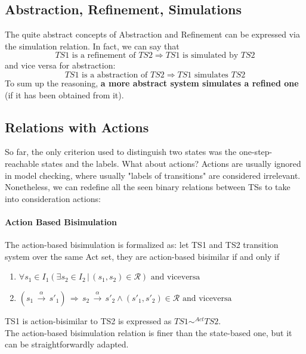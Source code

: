 \documentclass{article}
\begin{document}
			\subsection{Abstraction, Refinement, Simulations}
				The quite abstract concepts of Abstraction and Refinement can be expressed via the simulation relation. In fact, we can say that
				\begin{equation}
					TS1 \text{ is a refinement of } TS2 \Rightarrow TS1 \text{ is simulated by } TS2
				\end{equation}
				and vice versa for abstraction:
				\begin{equation}
					TS1 \text{ is a abstraction of } TS2 \Rightarrow TS1 \text{ simulates } TS2
				\end{equation}
				To sum up the reasoning, \textbf{a more abstract system simulates a refined one} (if it has been obtained from it).
	
			\subsection{Relations with Actions}
				So far, the only criterion used to distinguish two states was the one-step-reachable states and the labels. What about actions? Actions are usually ignored in model checking, where usually "labels of transitions" are considered irrelevant. Nonetheless, we can redefine all the seen binary relations between TSs to take into consideration actions:
				
				\paragraph{Action Based Bisimulation}
					The action-based bisimulation is formalized as: let TS1 and TS2 transition system over the same Act set, they are action-based bisimilar if and only if
					\begin{enumerate}
						\item $\forall s_1 \in I_1 (\exists s_2 \in I_2 \,\vert\, (s_1, s_2) \in \mathcal{R}) \text{ and viceversa}$
						\item $(s_1 \,\xrightarrow{\alpha}\, s'_1) \,\Rightarrow\, s_2 \,\xrightarrow{\alpha}\, s'_2 \wedge (s'_1, s'_2) \in \mathcal{R} \text{ and viceversa}$
					\end{enumerate}
					TS1 is action-bisimilar to TS2 is expressed as $TS1 \sim^{Act} TS2$.\\
					The action-based bisimulation relation is finer than the state-based one, but it can be straightforwardly adapted.
			
\end{document}

